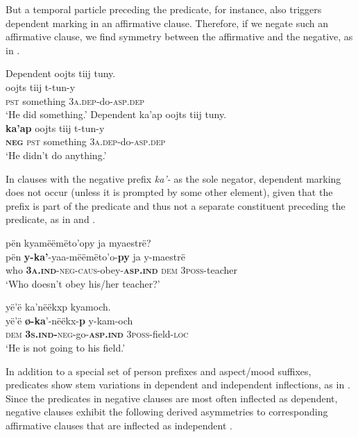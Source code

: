 \documentclass[output=paper,colorlinks,citecolor=brown,draft]{langscibook}
\begin{document}
But a temporal particle preceding the predicate, for instance, also triggers dependent marking in an affirmative clause. Therefore, if we negate such an affirmative clause, we find symmetry between the affirmative and the negative, as in .
 
\ea\label{ex:mix:18}
    \ea\label{ex:mix:18a}Dependent\newline
        \glll oojts tiij tuny. \\ 
              oojts tiij t-tun-y \\
              \textsc{pst} something \textsc{3a.dep}{}-do-\textsc{asp.dep}\\
        \glt ‘He did something.’
    \ex\label{ex:mix:18b}Dependent\newline 
        \glll ka’ap oojts tiij tuny.\\
              \textbf{ka’ap} oojts tiij t-tun-y\\
              \textbf{\textsc{neg}} \textsc{pst} something \textsc{3a.dep}{}-do-\textsc{asp.dep} \\
        \glt ‘He didn’t do anything.’
    \z
\z 

In clauses with the negative prefix \textit{ka’-} as the sole negator, dependent marking does not occur (unless it is prompted by some other element), given that the prefix is part of the predicate and thus not a separate constituent preceding the predicate, as in  and . 

\ea\label{ex:mix:19}
    \glll pën kyamëëmëto’opy ja myaestrë? \\
          pën \textbf{y-ka’}{}-yaa-mëëmëto’o-\textbf{py} ja y-maestrë \\
          who \textbf{\textsc{3a.ind}}{}-\textsc{neg-caus}{}-obey-\textbf{\textsc{asp.ind}} \textsc{dem} 3\textsc{poss}{}-teacher \\
    \glt ‘Who doesn’t obey his/her teacher?’
\z

\ea\label{ex:mix:20}
    \glll yë’ë ka’nëëkxp kyamoch. \\
          yë’ë \textbf{ø-ka}’-nëëkx-\textbf{p} y-kam-och \\
          \textsc{dem} \textbf{\textsc{3s.ind}}\textbf{{}-}\textsc{neg-}go-\textbf{\textsc{asp.ind}} \textsc{3poss}{}-field\textsc{{}-loc} \\
    \glt ‘He is not going to his field.’
\z

In addition to a special set of person prefixes and aspect/mood suffixes, predicates show stem variations in dependent and independent inflections, as in . Since the predicates in negative clauses are most often inflected as dependent, negative clauses exhibit the following derived asymmetries to corresponding affirmative clauses that are inflected as independent .
\end{document}
